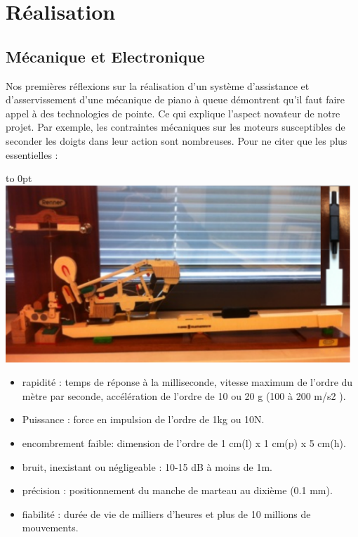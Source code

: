 \documentclass[french,a4paper,12pt]{report}
\begin{document}
\chapter{Réalisation}
  \section{Mécanique et Electronique}
Nos premières réflexions sur la réalisation d’un système d’assistance et d’asservissement d’une mécanique de piano à queue démontrent qu’il faut faire appel à des technologies de pointe. Ce qui explique l’aspect novateur de notre projet. Par exemple, les contraintes mécaniques sur les moteurs susceptibles de seconder les doigts dans leur action sont nombreuses. Pour ne citer que les plus essentielles :\newline

\hfill\hbox to 0pt{\hss\includegraphics[width=13cm]{MECA_PIANO2.png}\hss}\hfill\null\newline

\begin{itemize}
\item  rapidité : temps de réponse à la milliseconde, vitesse maximum de l’ordre du mètre par
seconde, accélération de l’ordre de 10 ou 20 g (100 à 200 m/s2 ).

\item Puissance : force en impulsion de l'ordre de 1kg ou 10N.

\item encombrement faible: dimension de l'ordre de 1 cm(l) x 1 cm(p) x 5 cm(h).

\item bruit, inexistant ou négligeable : 10-15 dB à moins de 1m.

\item précision : positionnement du manche de marteau au dixième (0.1 mm).

\item fiabilité : durée de vie de milliers d'heures et plus de 10 millions de mouvements.
\end{itemize}
\end{document}
